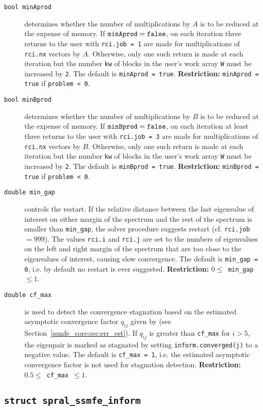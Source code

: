 \begin{description}
%
\item[\texttt{bool minAprod}]
determines whether the number of multiplications by $A$ 
is to be reduced at the expense of memory. 
If ${\tt minAprod = false}$, 
on each iteration three returns to the user
with {\tt rci.job = 1} are
made for multiplications of {\tt rci.nx} vectors by $A$.
Otherwise,  only one such return is made at each iteration but 
the number {\tt kw} of blocks in the user's work array {\tt W} 
must be increased by {\tt 2}.
The default is {\tt minAprod = true}.
{\bf Restriction:} {\tt minAprod = true} if {\tt problem < 0}.
%
\item[\texttt{bool minBprod}]
determines whether the number of multiplications by $B$ 
is to be reduced at the expense of memory. 
If ${\tt minBprod = false}$, 
on each iteration at least three returns to the user
with {\tt rci.job = 3} are
made for multiplications of {\tt rci.nx} vectors by $B$.
Otherwise,  only one such return is made at each iteration but 
the number {\tt kw} of blocks in the user's work array {\tt W} 
must be increased by {\tt 2}.
The default is {\tt minBprod = true}.
{\bf Restriction:} {\tt minBprod = true} if {\tt problem < 0}.
%
\item[\texttt{double min\_gap}] 
controls the restart.
If the relative distance between the last eigenvalue of interest
on either margin of the spectrum and the rest of the spectrum
is smaller than {\tt min\_gap},
the solver procedure suggests restart
(cf. {\tt rci.job $= 999$}).
The values 
{\tt rci.i}
and
{\tt rci.j}
are set to the numbers of eigenvalues on the left and right
margin of the spectrum that are too close to the eigenvalues
of interest, causing slow convergence.
The default is {\tt min\_gap = 0}, i.e.
by default no restart is ever suggested.
{\bf Restriction:} {\tt $0 \le$ min\_gap $\le 1$}.
%
\item[\texttt{double cf\_max}]
is used to detect the convergence stagnation
based on 
the estimated asymptotic convergence factor 
$q_{ij}$ given by 
(see Section~\ref{ssmfe_core:sec:err_est}).
If $q_{ij}$ is greater than {\tt cf\_max} for $i > 5$,
the eigenpair is marked as stagnated by setting
{\tt inform.converged(j)} to a negative value.
The default is {\tt cf\_max = 1}, i.e.
the estimated asymptotic convergence factor
is not used for stagnation detection.
{\bf Restriction:} {\tt $0.5 \le$ cf\_max $\le 1$}.
%
\end{description}

\subsection{\texttt{struct spral\_ssmfe\_inform}} \label{ssmfe_core:type:inform}

